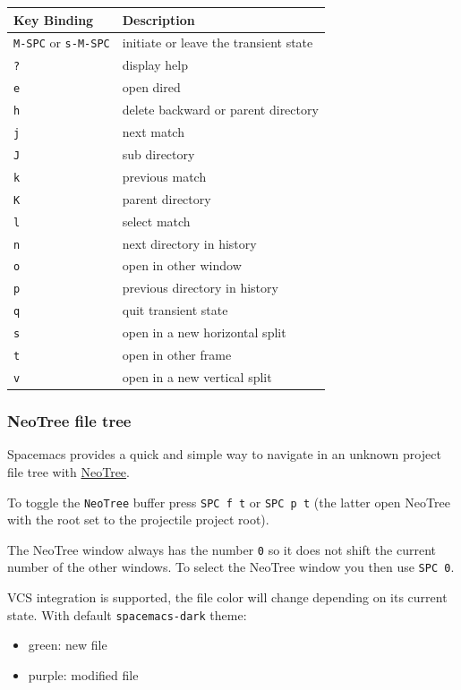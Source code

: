 \documentclass[11pt]{article}
\begin{document}
\begin{center}
\begin{tabular}{ll}
Key Binding & Description\\
\hline
\texttt{M-SPC} or \texttt{s-M-SPC} & initiate or leave the transient state\\
\texttt{?} & display help\\
\texttt{e} & open dired\\
\texttt{h} & delete backward or parent directory\\
\texttt{j} & next match\\
\texttt{J} & sub directory\\
\texttt{k} & previous match\\
\texttt{K} & parent directory\\
\texttt{l} & select match\\
\texttt{n} & next directory in history\\
\texttt{o} & open in other window\\
\texttt{p} & previous directory in history\\
\texttt{q} & quit transient state\\
\texttt{s} & open in a new horizontal split\\
\texttt{t} & open in other frame\\
\texttt{v} & open in a new vertical split\\
\end{tabular}
\end{center}

\subsubsection{NeoTree file tree}
\label{sec:org36ffcd3}
Spacemacs provides a quick and simple way to navigate in an unknown project
file tree with \href{https://github.com/jaypei/emacs-neotree}{NeoTree}.

To toggle the \texttt{NeoTree} buffer press \texttt{SPC f t} or \texttt{SPC p t} (the latter open
NeoTree with the root set to the projectile project root).

The NeoTree window always has the number \texttt{0} so it does not shift the current
number of the other windows. To select the NeoTree window you then use \texttt{SPC 0}.

VCS integration is supported, the file color will change depending on its
current state. With default \texttt{spacemacs-dark} theme:
\begin{itemize}
\item green: new file
\item purple: modified file
\end{itemize}
\end{document}
